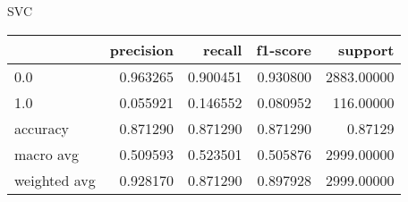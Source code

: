 SVC
\begin{tabular}{lrrrr}
\toprule
{} &  precision &    recall &  f1-score &     support \\
\midrule
0.0          &   0.963265 &  0.900451 &  0.930800 &  2883.00000 \\
1.0          &   0.055921 &  0.146552 &  0.080952 &   116.00000 \\
accuracy     &   0.871290 &  0.871290 &  0.871290 &     0.87129 \\
macro avg    &   0.509593 &  0.523501 &  0.505876 &  2999.00000 \\
weighted avg &   0.928170 &  0.871290 &  0.897928 &  2999.00000 \\
\bottomrule
\end{tabular}
